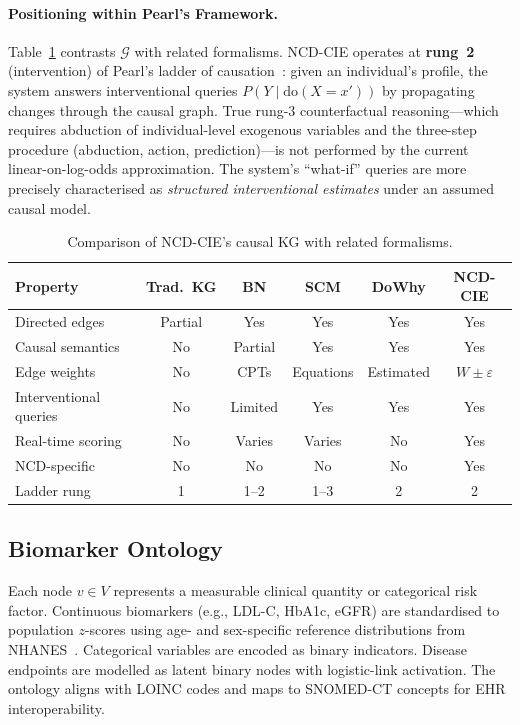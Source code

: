 \documentclass[runningheads]{llncs}
\begin{document}
\paragraph{Positioning within Pearl's Framework.}
Table~\ref{tab:comparison} contrasts $\mathcal{G}$ with related
formalisms.  NCD-CIE operates at \textbf{rung~2} (intervention) of
Pearl's ladder of causation~\cite{pearl2018book}: given an
individual's profile, the system answers interventional queries
$P(Y \mid \mathrm{do}(X = x'))$ by propagating changes through the
causal graph.  True rung-3 counterfactual reasoning---which requires
abduction of individual-level exogenous variables and the three-step
procedure (abduction, action, prediction)---is not performed by the
current linear-on-log-odds approximation.  The system's ``what-if''
queries are more precisely characterised as \emph{structured
interventional estimates} under an assumed causal model.

\begin{table}[t]
\centering
\caption{Comparison of NCD-CIE's causal KG with related formalisms.}
\label{tab:comparison}
\small
\begin{tabular}{@{}lccccc@{}}
\toprule
\textbf{Property} & \textbf{Trad.\ KG} & \textbf{BN} & \textbf{SCM} & \textbf{DoWhy} & \textbf{NCD-CIE} \\
\midrule
Directed edges       & Partial & Yes & Yes & Yes & Yes \\
Causal semantics     & No      & Partial & Yes & Yes & Yes \\
Edge weights         & No      & CPTs & Equations & Estimated & $W \pm \varepsilon$ \\
Interventional queries & No    & Limited & Yes & Yes & Yes \\
Real-time scoring    & No      & Varies & Varies & No & Yes \\
NCD-specific         & No      & No  & No  & No & Yes \\
Ladder rung          & 1       & 1--2 & 1--3 & 2  & 2 \\
\bottomrule
\end{tabular}
\end{table}

\subsection{Biomarker Ontology}\label{sec:ontology}

Each node $v \in V$ represents a measurable clinical quantity or
categorical risk factor.  Continuous biomarkers (e.g., LDL-C, HbA1c,
eGFR) are standardised to population $z$-scores using age- and
sex-specific reference distributions from NHANES~\cite{nhanes2020}.
Categorical variables are encoded as binary indicators.  Disease
endpoints are modelled as latent binary nodes with logistic-link
activation.  The ontology aligns with LOINC codes and maps to
SNOMED-CT concepts for EHR interoperability.
\end{document}
